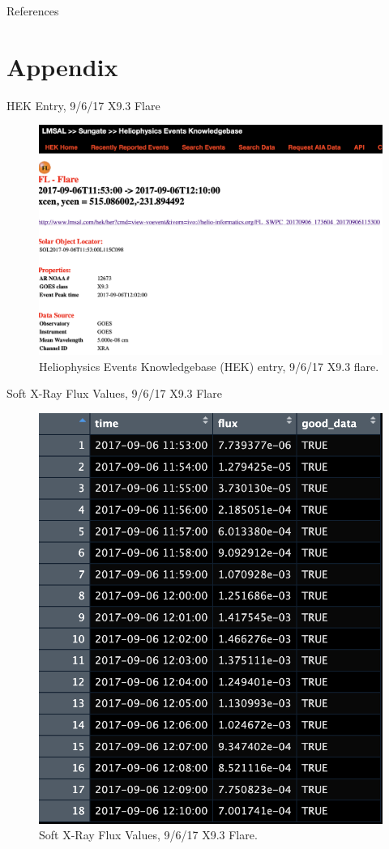 \documentclass{beamer}
\begin{document}
\begin{frame}[allowframebreaks]{References}
    \printbibliography
\end{frame}

\section{Appendix}

\begin{frame}{HEK Entry, 9/6/17 X9.3 Flare}
    \begin{figure}
        \centering
        \includegraphics[scale=0.3]{hek_entry_20170906.png}
        \caption{Heliophysics Events Knowledgebase (HEK) entry, 9/6/17 X9.3 flare.}
        \label{fig:hek_entry}
    \end{figure}
\end{frame}

\begin{frame}{Soft X-Ray Flux Values, 9/6/17 X9.3 Flare}
    \begin{figure}
        \centering
        \includegraphics[scale=0.4]{flux_vals_20170906.png}
        \caption{Soft X-Ray Flux Values, 9/6/17 X9.3 Flare.}
        \label{fig:flux_vals_20170906}
    \end{figure}
\end{frame}
\end{document}
